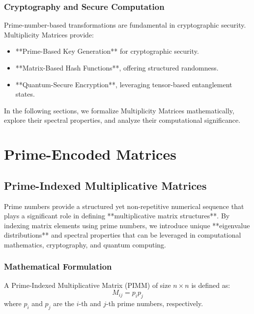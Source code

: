 \documentclass{article}
\theoremstyle{plain}
\begin{document}
\subsubsection{Cryptography and Secure Computation}
Prime-number-based transformations are fundamental in cryptographic security. Multiplicity Matrices provide:
\begin{itemize}
    \item **Prime-Based Key Generation** for cryptographic security.
    \item **Matrix-Based Hash Functions**, offering structured randomness.
    \item **Quantum-Secure Encryption**, leveraging tensor-based entanglement states.
\end{itemize}

In the following sections, we formalize Multiplicity Matrices mathematically, explore their spectral properties, and analyze their computational significance.
\section{Prime-Encoded Matrices}

\subsection{Prime-Indexed Multiplicative Matrices}

Prime numbers provide a structured yet non-repetitive numerical sequence that plays a significant role in defining **multiplicative matrix structures**. By indexing matrix elements using prime numbers, we introduce unique **eigenvalue distributions** and spectral properties that can be leveraged in computational mathematics, cryptography, and quantum computing.

\subsubsection{Mathematical Formulation}
A Prime-Indexed Multiplicative Matrix (PIMM) of size \( n \times n \) is defined as:
\begin{equation}
    M_{ij} = p_i p_j
\end{equation}
where \( p_i \) and \( p_j \) are the \( i \)-th and \( j \)-th prime numbers, respectively.
\end{document}
